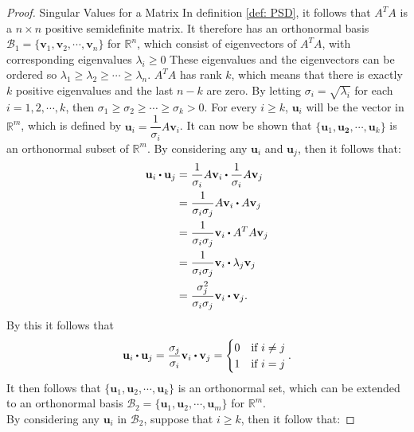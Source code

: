 \begin{proof}{Singular Values for a Matrix}
    In definition \ref{def: PSD}, it follows that $A^TA$ is a $n\times n$ positive semidefinite matrix. It therefore has an orthonormal basis $\mathcal{B}_1=\{\mathbf{v}_1, \mathbf{v}_2, \cdots, \mathbf{v}_n\}$ for $\mathbb{R}^n$, which consist of eigenvectors of $A^TA$, with corresponding eigenvalues $\lambda_i \geq 0$
    These eigenvalues and the eigenvectors can be ordered so $\lambda_1 \geq \lambda_2 \geq \cdots \geq \lambda_n$. $A^TA$ has rank $k$, which means that there is exactly $k$ positive eigenvalues and the last $n-k$ are zero. By letting $\sigma_i=\sqrt{\lambda_i}$ for each $i=1, 2, \cdots, k$, then $\sigma_1 \geq \sigma_2 \geq \cdots \geq \sigma_k > 0$. 
    For every $i\geq k$, $\mathbf{u}_i$ will be the vector in $\mathbb{R}^m$, which is defined by $\mathbf{u}_i=\dfrac{1}{\sigma_i}A\mathbf{v}_i$. It can now be shown that $\{\mathbf{u}_1, \mathbf{u_2}, \cdots, \mathbf{u}_k\}$ is an orthonormal subset of $\mathbb{R}^m$. By considering any $\mathbf{u}_i$ and $\mathbf{u}_j$, then it follows that:
    \begin{align*}
        \mathbf{u}_i \vprik \mathbf{u}_j &= \dfrac{1}{\sigma_i}A\mathbf{v}_i \vprik \dfrac{1}{\sigma_i}A\mathbf{v}_j\\
        &=\dfrac{1}{\sigma_i\sigma_j}A\mathbf{v}_i \vprik A\mathbf{v}_j\\
        &=\dfrac{1}{\sigma_i\sigma_j}\mathbf{v}_i \vprik A^T A\mathbf{v}_j\\
        &=\dfrac{1}{\sigma_i\sigma_j}\mathbf{v}_i \vprik \lambda_j\mathbf{v}_j\\
        &=\dfrac{\sigma^2_j}{\sigma_i\sigma_j}\mathbf{v}_i \vprik \mathbf{v}_j.
    \end{align*}
    By this it follows that
    \begin{align*}
        \mathbf{u}_i \vprik \mathbf{u}_j = \dfrac{\sigma_j}{\sigma_i}\mathbf{v}_i \vprik \mathbf{v}_j=
        \begin{cases}
        0 & \text{if } i\neq j\\
        1 & \text{if } i=j
        \end{cases}.
    \end{align*}
    It then follows that $\{\mathbf{u}_1, \mathbf{u}_2, \cdots, \mathbf{u}_k\}$ is an orthonormal set, which can be extended to an orthonormal basis $\mathcal{B}_2=\{ \mathbf{u}_1, \mathbf{u}_2, \cdots, \mathbf{u}_m\}$ for $\mathbb{R}^m$. \\
    By considering any $\mathbf{u}_i$ in $\mathcal{B}_2$, suppose that $i\geq k$, then it follow that:

\end{proof}
